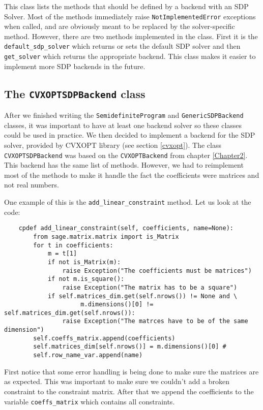 This class lists the methods that should be defined by a backend with an SDP Solver. Most of the methods immediately raise \texttt{NotImplementedError} exceptions when called, and are obviously meant to be replaced by the solver-specific method. However, there are two methods implemented in the class. First it is the \texttt{default\_sdp\_solver} which returns or sets the default SDP solver and then \texttt{get\_solver} which returns the appropriate backend. This class makes it easier to implement more SDP backends in the future.


\subsection{The \texttt{CVXOPTSDPBackend} class}
After we finished writing the \texttt{SemidefiniteProgram} and \texttt{GenericSDPBackend} classes, it was important to have at least one backend solver so these classes could be used in practice. We then decided to implement a backend for the SDP solver, provided by CVXOPT library (see section \ref{cvxopt}). The class \texttt{CVXOPTSDPBackend} was based on the \texttt{CVXOPTBackend} from chapter \ref{Chapter2}. This backend has the same list of methods. However, we had to reimplement most of the methods to make it handle the fact the coefficients were matrices and not real numbers. 

One example of this is the \texttt{add\_linear\_constraint} method. Let us look at the code:
\begin{verbatim}
    cpdef add_linear_constraint(self, coefficients, name=None):
        from sage.matrix.matrix import is_Matrix
        for t in coefficients:
            m = t[1]
            if not is_Matrix(m):
                raise Exception("The coefficients must be matrices")
            if not m.is_square():
                raise Exception("The matrix has to be a square")
            if self.matrices_dim.get(self.nrows()) != None and \
           			 m.dimensions()[0] != self.matrices_dim.get(self.nrows()):
                raise Exception("The matrces have to be of the same dimension")
        self.coeffs_matrix.append(coefficients)
        self.matrices_dim[self.nrows()] = m.dimensions()[0] #
        self.row_name_var.append(name)
\end{verbatim}

First notice that some error handling is being done to make sure the matrices are as expected. This was important to make sure we couldn't add a broken constraint to the constraint matrix. After that we append the coefficients to the variable \texttt{coeffs\_matrix} which contains all constraints.



